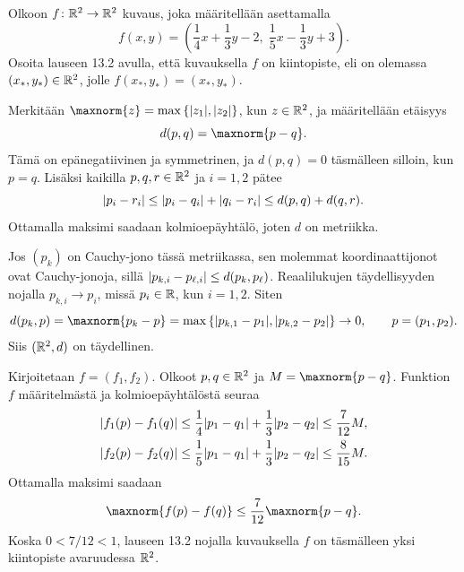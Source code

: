 \documentclass[11pt,a4paper]{amsart}
\begin{document}
\begin{exercise}
  Olkoon \(f\colon\mathbb{R}^2\to\mathbb{R}^2\) kuvaus, joka määritellään asettamalla
  \[
    f(x,y)=\left(\frac14x+\frac13y-2,\;
    \frac15x-\frac13y+3\right).
  \]
  Osoita lauseen 13.2 avulla, että kuvauksella \(f\) on kiintopiste,
  eli on olemassa \((x_*,y_*)\in\mathbb{R}^2\), jolle
  \(f(x_*,y_*)=(x_*,y_*)\).
\end{exercise}

\begin{solution}
  Merkitään \(\maxnorm{z}=\maxset{\abs{z_1},\abs{z_2}}\), kun
  \(z\in\mathbb{R}^2\), ja määritellään etäisyys
  \[
    d(p,q)=\maxnorm{p-q}.
  \]
  Tämä on epänegatiivinen ja symmetrinen, ja \(d(p,q)=0\) täsmälleen
  silloin, kun \(p=q\). Lisäksi kaikilla \(p,q,r\in\mathbb{R}^2\) ja \(i=1,2\)
  pätee
  \[
    \lvert p_i-r_i\rvert\leq\lvert p_i-q_i\rvert+\lvert q_i-r_i\rvert
    \leq d(p,q)+d(q,r).
  \]
  Ottamalla maksimi saadaan kolmioepäyhtälö, joten \(d\) on metriikka.

  Jos \((p_k)\) on Cauchy-jono tässä metriikassa, sen molemmat
  koordinaattijonot ovat Cauchy-jonoja, sillä
  \(\lvert p_{k,i}-p_{\ell,i}\rvert\leq d(p_k,p_\ell)\).
  Reaalilukujen täydellisyyden nojalla \(p_{k,i}\to p_i\), missä
  \(p_i\in\mathbb{R}\), kun \(i=1,2\). Siten
  \[
    d(p_k,p)=\maxnorm{p_k-p}
    =\maxset{\abs{p_{k,1}-p_1},\abs{p_{k,2}-p_2}}\to0,
    \qquad p=(p_1,p_2).
  \]
  Siis \((\mathbb{R}^2,d)\) on täydellinen.

  Kirjoitetaan \(f=(f_1,f_2)\). Olkoot \(p,q\in\mathbb{R}^2\) ja
  \(M=\maxnorm{p-q}\). Funktion \(f\) määritelmästä ja kolmioepäyhtälöstä seuraa
  \[
    \begin{aligned}
      \lvert f_1(p)-f_1(q)\rvert
      &\leq\frac14\lvert p_1-q_1\rvert+\frac13\lvert p_2-q_2\rvert
      \leq\frac7{12}M,\\
      \lvert f_2(p)-f_2(q)\rvert
      &\leq\frac15\lvert p_1-q_1\rvert+\frac13\lvert p_2-q_2\rvert
      \leq\frac8{15}M.
    \end{aligned}
  \]
  Ottamalla maksimi saadaan
  \[
    \maxnorm{f(p)-f(q)}\leq\frac7{12}\maxnorm{p-q}.
  \]
  Koska \(0<7/12<1\), lauseen 13.2 nojalla kuvauksella \(f\) on
  täsmälleen yksi kiintopiste avaruudessa \(\mathbb{R}^2\).
\end{solution}
\end{document}
